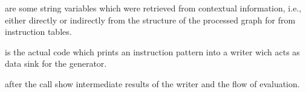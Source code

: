 \begin{description}
  \item {} are some string variables which were retrieved from contextual information, i.e., either directly or indirectly from the structure of the processed graph for from instruction tables.
  \item {} is the actual code which prints an instruction pattern into a writer wich acts as data sink for the generator.
  \item {} after the call show intermediate results of the writer and the flow of evaluation.
\end{description}




